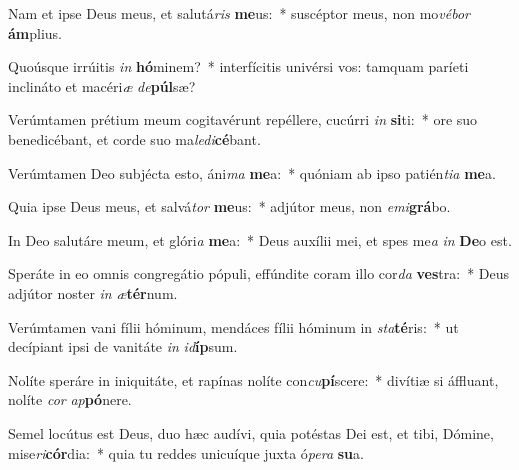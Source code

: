 \item Nam et ipse Deus meus, et salutá\textit{ris} \textbf{me}us:~* suscéptor meus, non mo\textit{vé}\textit{bor} \textbf{ám}plius.
\item Quoúsque irrúitis \textit{in} \textbf{hó}minem?~* interfícitis univérsi vos: tamquam paríeti inclináto et macéri\textit{æ} \textit{de}\textbf{púl}sæ?
\item Verúmtamen prétium meum cogitavérunt repéllere, cucúrri \textit{in} \textbf{si}ti:~* ore suo benedicébant, et corde suo ma\textit{le}\textit{di}\textbf{cé}bant.
\item Verúmtamen Deo subjécta esto, áni\textit{ma} \textbf{me}a:~* quóniam ab ipso patién\textit{ti}\textit{a} \textbf{me}a.
\item Quia ipse Deus meus, et salvá\textit{tor} \textbf{me}us:~* adjútor meus, non \textit{e}\textit{mi}\textbf{grá}bo.
\item In Deo salutáre meum, et glóri\textit{a} \textbf{me}a:~* Deus auxílii mei, et spes me\textit{a} \textit{in} \textbf{De}o est.
\item Speráte in eo omnis congregátio pópuli, effúndite coram illo cor\textit{da} \textbf{ves}tra:~* Deus adjútor noster \textit{in} \textit{æ}\textbf{tér}num.
\item Verúmtamen vani fílii hóminum, mendáces fílii hóminum in \textit{sta}\textbf{té}ris:~* ut decípiant ipsi de vanitáte \textit{in} \textit{id}\textbf{íp}sum.
\item Nolíte speráre in iniquitáte, et rapínas nolíte con\textit{cu}\textbf{pí}scere:~* divítiæ si áffluant, nolíte \textit{cor} \textit{ap}\textbf{pó}nere.
\item Semel locútus est Deus, duo hæc audívi, quia potéstas Dei est, et tibi, Dómine, mise\textit{ri}\textbf{cór}dia:~* quia tu reddes unicuíque juxta ó\textit{pe}\textit{ra} \textbf{su}a.
